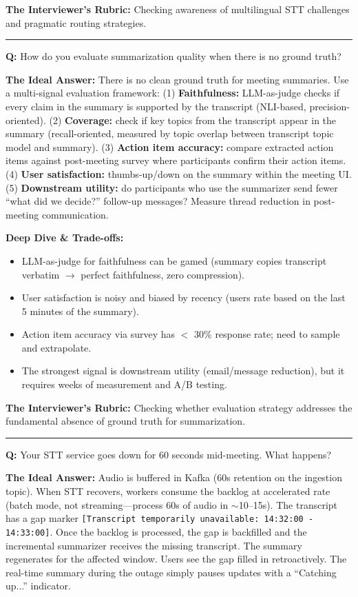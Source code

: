\textbf{The Interviewer's Rubric:} Checking awareness of multilingual STT challenges and pragmatic routing strategies.

\bigskip\hrule\bigskip

\textbf{Q:} How do you evaluate summarization quality when there is no ground truth?

\textbf{The Ideal Answer:} There is no clean ground truth for meeting summaries. Use a multi-signal evaluation framework: (1) \textbf{Faithfulness:} LLM-as-judge checks if every claim in the summary is supported by the transcript (NLI-based, precision-oriented). (2) \textbf{Coverage:} check if key topics from the transcript appear in the summary (recall-oriented, measured by topic overlap between transcript topic model and summary). (3) \textbf{Action item accuracy:} compare extracted action items against post-meeting survey where participants confirm their action items. (4) \textbf{User satisfaction:} thumbs-up/down on the summary within the meeting UI. (5) \textbf{Downstream utility:} do participants who use the summarizer send fewer ``what did we decide?'' follow-up messages? Measure thread reduction in post-meeting communication.

\textbf{Deep Dive \& Trade-offs:}
\begin{itemize}
  \item LLM-as-judge for faithfulness can be gamed (summary copies transcript verbatim $\rightarrow$ perfect faithfulness, zero compression).
  \item User satisfaction is noisy and biased by recency (users rate based on the last 5 minutes of the summary).
  \item Action item accuracy via survey has $<$ 30\% response rate; need to sample and extrapolate.
  \item The strongest signal is downstream utility (email/message reduction), but it requires weeks of measurement and A/B testing.
\end{itemize}

\textbf{The Interviewer's Rubric:} Checking whether evaluation strategy addresses the fundamental absence of ground truth for summarization.

\bigskip\hrule\bigskip

\textbf{Q:} Your STT service goes down for 60 seconds mid-meeting. What happens?

\textbf{The Ideal Answer:} Audio is buffered in Kafka (60s retention on the ingestion topic). When STT recovers, workers consume the backlog at accelerated rate (batch mode, not streaming---process 60s of audio in $\sim$10--15s). The transcript has a gap marker \texttt{[Transcript temporarily unavailable: 14:32:00 - 14:33:00]}. Once the backlog is processed, the gap is backfilled and the incremental summarizer receives the missing transcript. The summary regenerates for the affected window. Users see the gap filled in retroactively. The real-time summary during the outage simply pauses updates with a ``Catching up...'' indicator.

